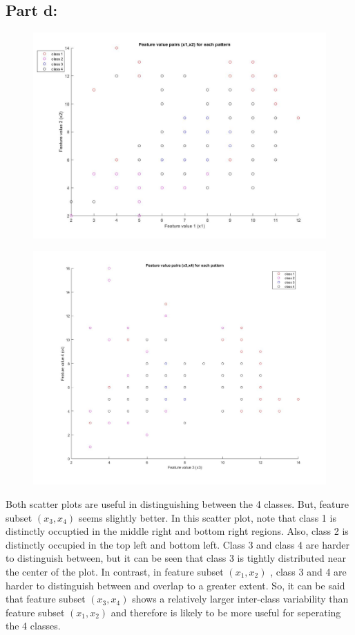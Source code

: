 \documentclass[a4paper,12pt]{article}
\begin{document}
\subsection*{Part d:}
\begin{figure}[H]
\centering
\includegraphics[scale=0.3]{q1pd_1.jpg}
\end{figure}
\pagebreak
\begin{figure}[H]
\centering
\includegraphics[scale=0.3]{q1pd_2.jpg}
\end{figure}

Both scatter plots are useful in distinguishing between the 4 classes. But, feature subset $(x_3,x_4)$ seems slightly better. In this scatter plot, note that class 1 is distinctly occuptied in the middle right and bottom right regions. Also, class 2 is distinctly occupied in the top left and bottom left. Class 3 and class 4 are harder to distinguish between, but it can be seen that class 3 is tightly distributed near the center of the plot. In contrast, in feature subset $(x_1,x_2)$ , class 3 and 4 are harder to distinguish between and overlap to a greater extent. So, it can be said that feature subset $(x_3,x_4)$ shows a relatively larger inter-class variability than feature subset $(x_1,x_2)$ and therefore is likely to be more useful for seperating the 4 classes.
\end{document}
